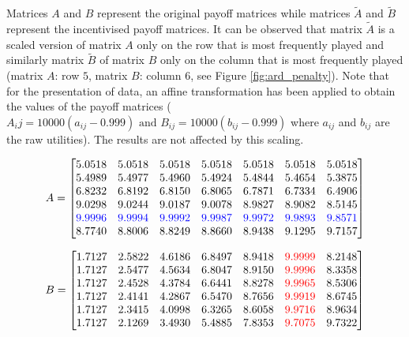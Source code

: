 Matrices \(A\) and \(B\) represent the original payoff matrices while matrices
\(\tilde{A}\) and \(\tilde{B}\) represent the incentivised payoff matrices.
It can be observed that matrix \(\tilde{A}\) is a scaled version of matrix 
\(A\) only on the row that is most frequently played and similarly matrix 
\(\tilde{B}\) of matrix \(B\) only on the column that is most frequently played
(matrix \(A\): row \(5\), matrix \(B\): column \(6\), see Figure 
\ref{fig:ard_penalty}).
Note that for the presentation of data, an affine transformation has been
applied to obtain the values of the payoff matrices
(\(A_ij = 10000(a_{ij} - 0.999) \text{ and } B_{ij} = 10000(b_{ij} - 0.999)\)
where \(a_{ij}\) and \(b_{ij}\) are the raw utilities).
The results are not affected by this scaling.

\tiny
\begin{equation*}
    A = 
    \begin{bmatrix}
        5.0518 & 5.0518 & 5.0518 & 5.0518 & 5.0518 &
        5.0518 & 5.0518 \\
        5.4989 & 5.4977 & 5.4960 & 5.4924 & 5.4844 &
        5.4654 & 5.3875 \\
        6.8232  & 6.8192 & 6.8150 & 6.8065 & 6.7871  &
        6.7334 & 6.4906 \\
        9.0298 & 9.0244 & 9.0187 & 9.0078 & 8.9827 &
        8.9082 & 8.5145 \\
        \color{blue}9.9996 & \color{blue}9.9994 & \color{blue}9.9992 & 
        \color{blue}9.9987 & \color{blue}9.9972 & \color{blue}9.9893 & 
        \color{blue}9.8571 \\
        8.7740 & 8.8006 & 8.8249 & 8.8660 & 8.9438 &
        9.1295 & 9.7157
    \end{bmatrix}
\end{equation*}

\begin{equation*}
    B = 
    \begin{bmatrix}
        1.7127 & 2.5822 & 4.6186 & 6.8497 & 8.9418 &
        \color{red}9.9999 & 8.2148 \\
        1.7127 & 2.5477 & 4.5634 & 6.8047 & 8.9150  &
        \color{red}9.9996 & 8.3358 \\
        1.7127 & 2.4528    & 4.3784 & 6.6441 & 8.8278 &
        \color{red}9.9965 & 8.5306 \\
        1.7127 & 2.4141 & 4.2867 & 6.5470 & 8.7656 &
        \color{red}9.9919 & 8.6745 \\
        1.7127 & 2.3415 & 4.0998 & 6.3265 & 8.6058 &
        \color{red}9.9716 & 8.9634 \\
        1.7127 & 2.1269 & 3.4930 & 5.4885 & 7.8353 &
        \color{red}9.7075 & 9.7322 \\
    \end{bmatrix}
\end{equation*}

